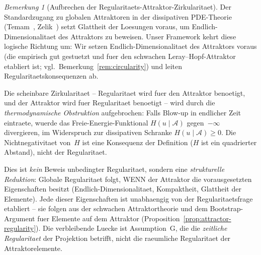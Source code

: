 \documentclass[12pt,a4paper]{article}
\theoremstyle{definition}
\theoremstyle{plain}
\theoremstyle{remark}
\newtheorem{remark}[definition]{Bemerkung}
\begin{document}
\begin{remark}[Aufbrechen der Regularitaets-Attraktor-Zirkularitaet]
\label{rem:circularity-discussion}
Der Standardzugang zu globalen Attraktoren in der dissipativen
PDE-Theorie (Temam~\cite{Temam2001}, Zelik~\cite{Zelik2014}) setzt
Glattheit der Loesungen voraus, um Endlich-Dimensionalitaet des
Attraktors zu beweisen. Unser Framework kehrt diese logische
Richtung um: Wir setzen Endlich-Dimensionalitaet des Attraktors
voraus (die empirisch gut gestuetzt und fuer den schwachen
Leray--Hopf-Attraktor etabliert ist; vgl.\
Bemerkung~\ref{rem:circularity}) und leiten
Regularitaetskonsequenzen ab.

Die scheinbare Zirkularitaet -- Regularitaet wird fuer den Attraktor
benoetigt, und der Attraktor wird fuer Regularitaet benoetigt -- wird
durch die \emph{thermodynamische Obstruktion} aufgebrochen: Falls
Blow-up in endlicher Zeit eintraete, wuerde das Freie-Energie-Funktional
$H(u \mid \mathcal{A})$ gegen~$-\infty$ divergieren, im Widerspruch
zur dissipativen Schranke $H(u \mid \mathcal{A}) \ge 0$.
Die Nichtnegativitaet von~$H$ ist eine Konsequenz der Definition
($H$ ist ein quadrierter Abstand), nicht der Regularitaet.

Dies ist \emph{kein} Beweis unbedingter Regularitaet, sondern eine
\emph{strukturelle Reduktion}: Globale Regularitaet folgt, WENN
der Attraktor die vorausgesetzten Eigenschaften besitzt
(Endlich-Dimensionalitaet, Kompaktheit, Glattheit der Elemente).
Jede dieser Eigenschaften ist unabhaengig von der Regularitaetsfrage
etabliert -- sie folgen aus der schwachen Attraktortheorie und dem
Bootstrap-Argument fuer Elemente auf dem Attraktor
(Proposition~\ref{prop:attractor-regularity}). Die verbleibende
Luecke ist Assumption~G, die die \emph{zeitliche Regularitaet} der
Projektion betrifft, nicht die raeumliche Regularitaet der
Attraktorelemente.
\end{remark}
\end{document}
